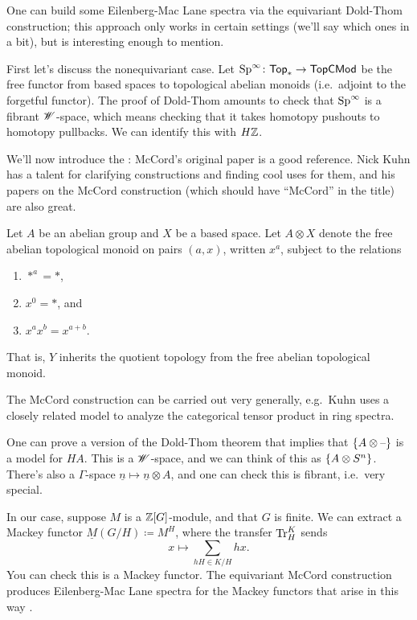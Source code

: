 \begin{cons}
One can build some Eilenberg-Mac Lane spectra via the equivariant Dold-Thom construction; this approach only works
in certain settings (we'll say which ones in a bit), but is interesting enough to mention.

First let's discuss the nonequivariant case. Let $\mathrm{Sp}^\infty\colon\mathsf{Top}_*\to\mathsf{TopCMod}$ be the free functor
from based spaces to topological abelian monoids (i.e.\ adjoint to the forgetful functor). The proof of Dold-Thom
amounts to check that $\mathrm{Sp}^\infty$ is a fibrant $\mathscr W$-space, which means checking that it takes homotopy pushouts
to homotopy pullbacks. We can identify this with $H\mathbb Z$.

We'll now introduce the : McCord's original paper is a good reference. Nick Kuhn has a
talent for clarifying constructions and finding cool uses for them, and his papers on the McCord construction
(which should have ``McCord'' in the title) are also great.

Let $A$ be an abelian group and $X$ be a based space. Let $A\otimes X$ denote the free abelian topological monoid
on pairs $(a,x)$, written $x^a$, subject to the relations
\begin{enumerate}
	\item $*^a = *$,
	\item $x^0 = *$, and
	\item $x^ax^b = x^{a+b}$.
\end{enumerate}
That is, $Y$ inherits the quotient topology from the free abelian topological monoid.
\begin{rem}
The McCord construction can be carried out very generally, e.g.\ Kuhn uses a closely related model to analyze the
categorical tensor product in ring spectra.
\end{rem}
One can prove a version of the Dold-Thom theorem that implies that $\{A\otimes\text{--}\}$ is a model for $HA$. This is
a $\mathscr W$-space, and we can think of this as $\{A\otimes S^n\}$. There's also a $\Gamma$-space $\underline n\mapsto
\underline n\otimes A$, and one can check this is fibrant, i.e.\ very special.

In our case, suppose $M$ is a $\mathbb Z[G]$-module, and that $G$ is finite. We can extract a Mackey functor $\underline
M(G/H)\coloneqq M^H$, where the transfer $\operatorname{Tr}_H^K$ sends
\[x\mapsto \sum_{hH\in K/H} hx.\]
You can check this is a Mackey functor. The equivariant McCord construction produces Eilenberg-Mac Lane spectra for
the Mackey functors that arise in this way .


\end{cons}
